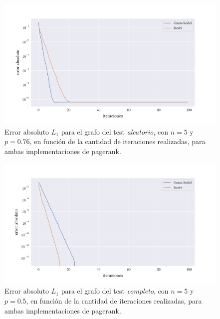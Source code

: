 \begin{figure}[!htbp]
    \centering
    \includegraphics[width=1\textwidth]{files/src/.media/convergencia_test_aleatorio.png}
    \caption{Error absoluto $L_1$ para el grafo del test \textit{aleatorio}, con $n = 5$ y $p = 0.76$, en función de la cantidad de iteraciones realizadas, para ambas implementaciones de pagerank.} \label{test_aleatorio}
\end{figure}

\begin{figure}[!htbp]
    \centering
    \includegraphics[width=1\textwidth]{files/src/.media/convergencia_test_completo.png}
    \caption{Error absoluto $L_1$ para el grafo del test \textit{completo}, con $n = 5$ y $p = 0.5$, en función de la cantidad de iteraciones realizadas, para ambas implementaciones de pagerank.} \label{test_completo}
\end{figure}

